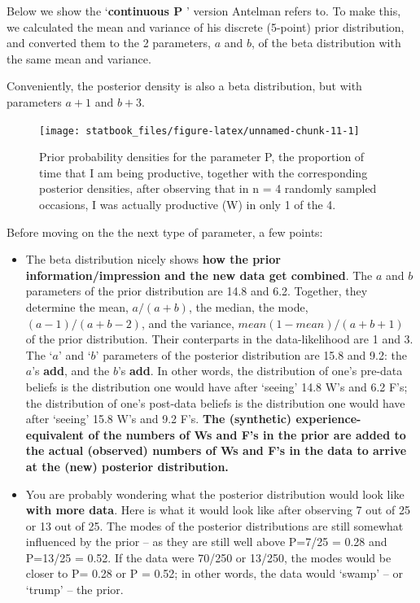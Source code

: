 \documentclass[]{book}
\begin{document}
Below we show the `\textbf{continuous P }' version Antelman refers to. To make this, we calculated the mean and variance of his discrete (5-point) prior distribution, and converted them to the 2 parameters, \(a\) and \(b\), of the beta distribution with the same mean and variance.

Conveniently, the posterior density is also a beta distribution, but with parameters \(a+1\) and \(b+3\).

\begin{figure}

{\centering \texttt{[image: statbook\_files/figure-latex/unnamed-chunk-11-1]} 

}

\caption{Prior probability densities for the parameter P, the proportion of time that I am being productive, together with the corresponding posterior densities, after observing that in n = 4 randomly sampled occasions, I was actually productive  (W) in only 1 of the 4.}\label{fig:unnamed-chunk-11}
\end{figure}

Before moving on the the next type of parameter, a few points:

\begin{itemize}
\item
  The beta distribution nicely shows \textbf{how the prior information/impression and the new data get combined}. The \(a\) and \(b\) parameters of the prior distribution are 14.8 and 6.2. Together, they determine the mean, \(a/(a+b)\), the median, the mode, \((a-1)/(a+b-2)\), and the variance,
  \(mean(1-mean)/(a+b+1)\) of the prior distribution.
  Their conterparts in the data-likelihood are 1 and 3. The `\(a\)' and `\(b\)' parameters of the posterior distribution are 15.8 and 9.2: the \(a\)'s \textbf{add}, and the \(b\)'s \textbf{add}. In other words, the distribution of one's pre-data beliefs is the distribution one would have after `seeing' 14.8 W's and 6.2 F's; the distribution of one's post-data beliefs is the distribution one would have after `seeing' 15.8 W's and 9.2 F's. \textbf{The (synthetic) experience-equivalent of the numbers of Ws and F's in the prior are added to the actual (observed) numbers of Ws and F's in the data to arrive at the (new) posterior distribution.}
\item
  You are probably wondering what the posterior distribution would look like \textbf{with more data}. Here is what it would look like after observing 7 out of 25 or 13 out of 25. The modes of the posterior distributions are still somewhat influenced by the prior -- as they are still well above P=7/25 = 0.28 and P=13/25 = 0.52. If the data were 70/250 or 13/250, the modes would be closer to P= 0.28 or P = 0.52; in other words, the data would `swamp' -- or `trump' -- the prior.
\end{itemize}
\end{document}

